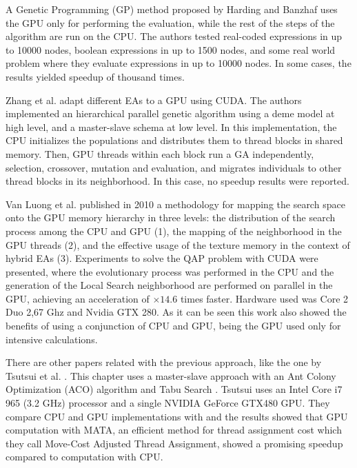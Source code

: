 \documentclass{comjnl}
\begin{document}
A Genetic Programming (GP) method proposed by Harding and Banzhaf \cite{4215552} uses the GPU only for performing the evaluation, while the rest of the steps of the algorithm are run on the CPU. The authors tested real-coded expressions in up to 10000 nodes, boolean expressions in up to 1500 nodes, and some real world problem where they evaluate expressions in up to 10000 nodes. In some cases, the results yielded speedup of thousand times.

Zhang et al. \cite{ZhangImplementationMasterSlave} adapt different EAs to a GPU using CUDA. The authors implemented an hierarchical parallel genetic algorithm using a deme model at high level, and a master-slave schema at low level. In this implementation, the CPU initializes the populations and distributes them to thread blocks in shared memory. Then, GPU threads within each block run a GA independently, selection, crossover, mutation and evaluation, and migrates individuals to other thread blocks in its neighborhood. In this case, no speedup results were reported.

Van Luong et al. \cite{5586403} published in 2010 a methodology for mapping the search space onto the GPU memory hierarchy in three levels: the distribution of the search process among the CPU and GPU (1), the mapping of the neighborhood in the GPU threads (2), and the effective usage of the texture memory in the context of hybrid EAs (3). Experiments to solve the QAP problem with CUDA were presented, where the evolutionary process was performed in the CPU and the generation of the Local Search neighborhood are performed on parallel in the GPU, achieving an acceleration of $\times14.6$ times faster. Hardware used was Core 2 Duo 2,67 Ghz and Nvidia GTX 280. As it can be seen this work also showed the benefits of using a conjunction of CPU and GPU, being the GPU used only for intensive calculations.

There are other papers related with the previous approach, like the one by Tsutsui et al. \cite{Tsutsui:2011:GECCO}. This chapter uses a master-slave approach with an Ant Colony Optimization (ACO) algorithm \cite{Dorigo:1999:ACO:329055_329062} and Tabu Search \cite{Glover:1997:TS:549765}. Tsutsui uses an Intel Core i7 965 (3.2 GHz) processor and a single NVIDIA GeForce GTX480 GPU. They compare CPU and GPU implementations with and the results showed that GPU computation with MATA, an efficient method for thread assignment cost which they call Move-Cost Adjusted Thread Assignment, showed a promising speedup compared to computation with CPU.
\end{document}
